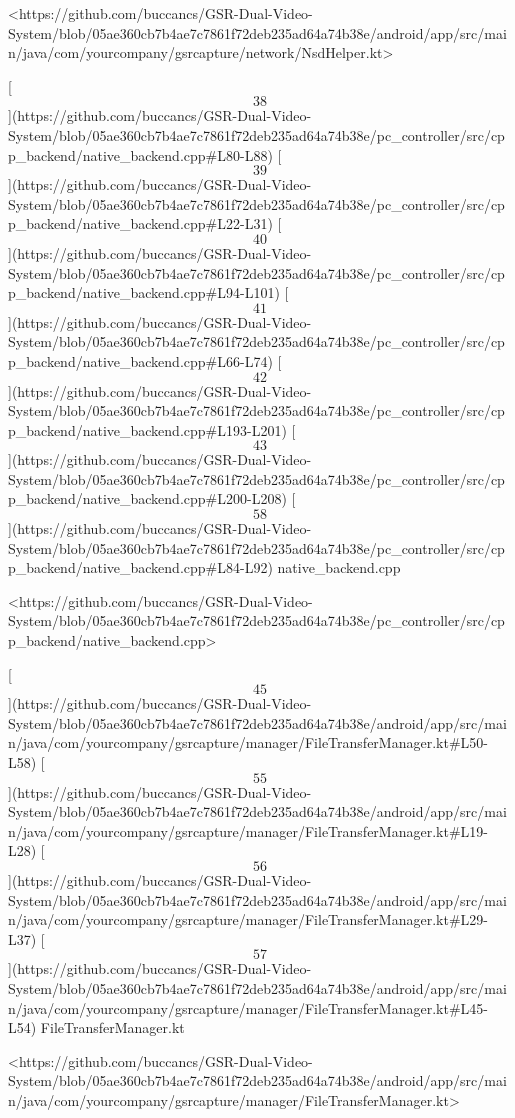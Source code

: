 \documentclass[12pt,a4paper]{article}
\begin{document}
{<https://github.com/buccancs/GSR-Dual-Video-System/blob/05ae360cb7b4ae7c7861f72deb235ad64a74b38e/android/app/src/main/java/com/yourcompany/gsrcapture/network/NsdHelper.kt>

[\[38\]](https://github.com/buccancs/GSR-Dual-Video-System/blob/05ae360cb7b4ae7c7861f72deb235ad64a74b38e/pc_controller/src/cpp_backend/native_backend.cpp#L80-L88)
[\[39\]](https://github.com/buccancs/GSR-Dual-Video-System/blob/05ae360cb7b4ae7c7861f72deb235ad64a74b38e/pc_controller/src/cpp_backend/native_backend.cpp#L22-L31)
[\[40\]](https://github.com/buccancs/GSR-Dual-Video-System/blob/05ae360cb7b4ae7c7861f72deb235ad64a74b38e/pc_controller/src/cpp_backend/native_backend.cpp#L94-L101)
[\[41\]](https://github.com/buccancs/GSR-Dual-Video-System/blob/05ae360cb7b4ae7c7861f72deb235ad64a74b38e/pc_controller/src/cpp_backend/native_backend.cpp#L66-L74)
[\[42\]](https://github.com/buccancs/GSR-Dual-Video-System/blob/05ae360cb7b4ae7c7861f72deb235ad64a74b38e/pc_controller/src/cpp_backend/native_backend.cpp#L193-L201)
[\[43\]](https://github.com/buccancs/GSR-Dual-Video-System/blob/05ae360cb7b4ae7c7861f72deb235ad64a74b38e/pc_controller/src/cpp_backend/native_backend.cpp#L200-L208)
[\[58\]](https://github.com/buccancs/GSR-Dual-Video-System/blob/05ae360cb7b4ae7c7861f72deb235ad64a74b38e/pc_controller/src/cpp_backend/native_backend.cpp#L84-L92)
native_backend.cpp

<https://github.com/buccancs/GSR-Dual-Video-System/blob/05ae360cb7b4ae7c7861f72deb235ad64a74b38e/pc_controller/src/cpp_backend/native_backend.cpp>

[\[45\]](https://github.com/buccancs/GSR-Dual-Video-System/blob/05ae360cb7b4ae7c7861f72deb235ad64a74b38e/android/app/src/main/java/com/yourcompany/gsrcapture/manager/FileTransferManager.kt#L50-L58)
[\[55\]](https://github.com/buccancs/GSR-Dual-Video-System/blob/05ae360cb7b4ae7c7861f72deb235ad64a74b38e/android/app/src/main/java/com/yourcompany/gsrcapture/manager/FileTransferManager.kt#L19-L28)
[\[56\]](https://github.com/buccancs/GSR-Dual-Video-System/blob/05ae360cb7b4ae7c7861f72deb235ad64a74b38e/android/app/src/main/java/com/yourcompany/gsrcapture/manager/FileTransferManager.kt#L29-L37)
[\[57\]](https://github.com/buccancs/GSR-Dual-Video-System/blob/05ae360cb7b4ae7c7861f72deb235ad64a74b38e/android/app/src/main/java/com/yourcompany/gsrcapture/manager/FileTransferManager.kt#L45-L54)
FileTransferManager.kt

<https://github.com/buccancs/GSR-Dual-Video-System/blob/05ae360cb7b4ae7c7861f72deb235ad64a74b38e/android/app/src/main/java/com/yourcompany/gsrcapture/manager/FileTransferManager.kt>

}
\end{document}
